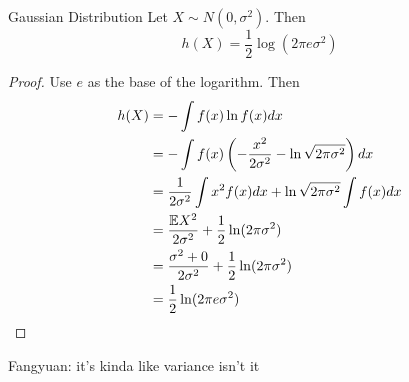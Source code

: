 \documentclass[../main.tex]{subfiles}
\begin{document}
\begin{pbox}{Gaussian Distribution}
    Let $X\sim N(0,\sigma^2)$. Then \[
    h(X) = \frac{1}{2}\log(2\pi e \sigma^2)
    \]
    \begin{proof}
        Use $e$ as the base of the logarithm. Then \begin{align*}
            h(X) &= - \int f(x) \ln f(x)dx\\
            &= -\int f(x) \left(-\frac{x^2}{2\sigma^2}-\ln \sqrt{2\pi\sigma^2}\right)dx\\
            &= \frac{1}{2\sigma^2}\int x^2 f(x) dx + \ln\sqrt{2\pi\sigma^2}\int f(x)dx\\
            &= \frac{\mathbb{E} X^2}{2\sigma^2} + \frac{1}{2}\ln (2\pi \sigma^2)\\
            &= \frac{\sigma^2 + 0}{2\sigma^2} + \frac{1}{2}\ln (2\pi \sigma^2)\\
            &= \frac{1}{2}\ln(2\pi e \sigma^2)
        \end{align*}
    \end{proof}
    Fangyuan: it's kinda like variance isn't it
\end{pbox}
\end{document}
